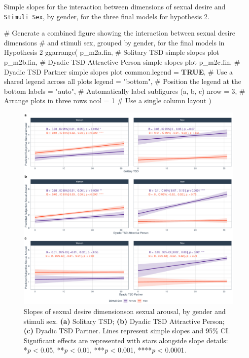 \documentclass[
  bookmarksnumbered]{article}
\newenvironment{Shaded}{\begin{snugshade}}{\end{snugshade}}
\newcommand{\AttributeTok}[1]{\textcolor[rgb]{0.80,0.80,0.80}{#1}}
\newcommand{\CommentTok}[1]{\textcolor[rgb]{0.50,0.62,0.50}{#1}}
\newcommand{\ConstantTok}[1]{\textcolor[rgb]{0.86,0.64,0.64}{\textbf{#1}}}
\newcommand{\DecValTok}[1]{\textcolor[rgb]{0.86,0.86,0.80}{#1}}
\newcommand{\FunctionTok}[1]{\textcolor[rgb]{0.94,0.94,0.56}{#1}}
\newcommand{\NormalTok}[1]{\textcolor[rgb]{0.80,0.80,0.80}{#1}}
\newcommand{\StringTok}[1]{\textcolor[rgb]{0.80,0.58,0.58}{#1}}
\begin{document}
Simple slopes for the interaction between dimensions of sexual desire and \texttt{Stimuli\ Sex}, by gender, for the three final models for hypothesis 2.

\begin{Shaded}
\begin{Highlighting}[]
\CommentTok{\# Generate a combined figure showing the interaction between sexual desire dimensions}
\CommentTok{\# and stimuli sex, grouped by gender, for the final models in Hypothesis 2}
\FunctionTok{ggarrange}\NormalTok{(}
\NormalTok{  p\_m2a.fin, }\CommentTok{\# Solitary TSD simple slopes plot}
\NormalTok{  p\_m2b.fin, }\CommentTok{\# Dyadic TSD Attractive Person simple slopes plot}
\NormalTok{  p\_m2c.fin, }\CommentTok{\# Dyadic TSD Partner simple slopes plot}
  \AttributeTok{common.legend =} \ConstantTok{TRUE}\NormalTok{, }\CommentTok{\# Use a shared legend across all plots}
  \AttributeTok{legend =} \StringTok{"bottom"}\NormalTok{, }\CommentTok{\# Position the legend at the bottom}
  \AttributeTok{labels =} \StringTok{"auto"}\NormalTok{, }\CommentTok{\# Automatically label subfigures (a, b, c)}
  \AttributeTok{nrow =} \DecValTok{3}\NormalTok{, }\CommentTok{\# Arrange plots in three rows}
  \AttributeTok{ncol =} \DecValTok{1} \CommentTok{\# Use a single column layout}
\NormalTok{)}
\end{Highlighting}
\end{Shaded}

\begin{figure}
\centering
\includegraphics{Sexual_Desire_Arousal_files/figure-latex/fig-m2-fin-1.pdf}
\caption{\label{fig:fig-m2-fin}Slopes of sexual desire dimensionson sexual arousal, by gender and stimuli sex. \textbf{(a)} Solitary TSD; \textbf{(b)} Dyadic TSD Attractive Person; \textbf{(c)} Dyadic TSD Partner. Lines represent simple slopes and 95\% CI. Significant effects are represented with stars alongside slope details: *\emph{p} \textless{} 0.05, **\emph{p} \textless{} 0.01, ***\emph{p} \textless{} 0.001, ****\emph{p} \textless{} 0.0001.}
\end{figure}
\end{document}
